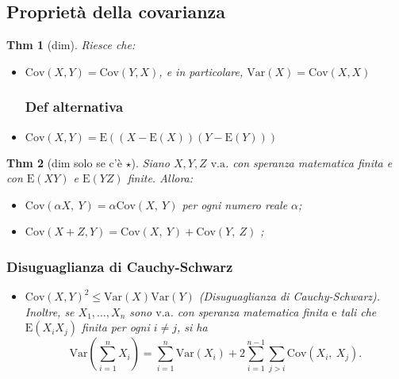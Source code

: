 \documentclass[a4paper,11pt]{article}
\theoremstyle{plain}
\newtheorem{thm}{Thm}[section]
\theoremstyle{definition}
\theoremstyle{remark}
\begin{document}
\subsection{Proprietà della covarianza}
\begin{thm}[dim] Riesce che:
\begin{itemize} 
\subsubsection{Commutativa}
\item  $\mathrm{C}\mathrm{o}\mathrm{v}(X, Y)=\mathrm{C}\mathrm{o}\mathrm{v}(Y,X)$, e in particolare, $\mathrm{V} \mathrm{a} \mathrm{r}(X) =\mathrm{C}\mathrm{o}\mathrm{v}(X, X)$
\subsubsection{Def alternativa}
\item $\mathrm{C}\mathrm{o}\mathrm{v}(X,Y)=\mathrm{E}((X-\mathrm{E}(X))(Y-\mathrm{E}(Y)))$
\end{itemize}
\end{thm}

\begin{thm}[dim solo se c'è $\star$] Siano $X, Y, Z$ $\mathrm{v}.\mathrm{a}$. con speranza matematica finita e con $\mathrm{E}(XY)$ e  $\mathrm{E}(YZ)$ finite. Allora:
\begin{itemize}
\item[$\star$] $\mathrm{C}\mathrm{o}\mathrm{v}(\alpha X,\ Y)=\alpha \mathrm{C}\mathrm{o}\mathrm{v}(X,\ Y)$ per ogni numero reale $\alpha$;
\item[$\star$] $\mathrm{C}\mathrm{o}\mathrm{v}(X+Z,
Y)=\mathrm{C}\mathrm{o}\mathrm{v}(X,\ Y)+\mathrm{C}\mathrm{o}\mathrm{v}(Y,\ Z)$ ;
\end{itemize}

\subsubsection{Disuguaglianza di Cauchy-Schwarz}
\begin{itemize}
\item[$\star$] $\mathrm{C}\mathrm{o}\mathrm{v}(X, Y)^{2}\leq \mathrm{V}\mathrm{a}\mathrm{r}(X)\mathrm{V}\mathrm{a}\mathrm{r}(Y)$ (Disuguaglianza di Cauchy-Schwarz).\\

\noindent
Inoltre, se $X_{1}, \ldots, X_{n}$ sono $\mathrm{v}.\mathrm{a}$. con speranza matematica finita $\mathrm{e}$ tali che $\mathrm{E}(X_{i}X_{j})$ finita per ogni $i\neq j$, si ha
$$
\mathrm{Var} (\displaystyle \sum_{i=1}^{n}X_{i})=\sum_{i=1}^{n} \mathrm{Var} (X_{i})+2\displaystyle \sum_{i=1}^{n-1}\sum_{j>i}\mathrm{C}\mathrm{o}\mathrm{v}(X_{i},\ X_{j}) .
$$
\end{itemize}
\end{thm}
\end{document}
